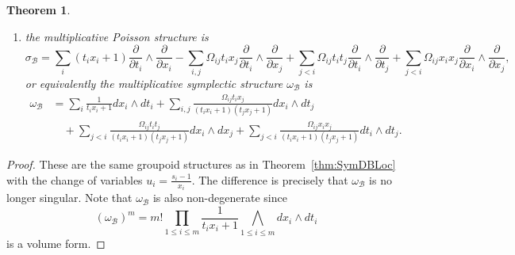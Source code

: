\documentclass{amsart}
\newtheorem{theorem}{Theorem}[section]
\numberwithin{equation}{section}
\newcommand{\cB}{\mathcal{B}}
\begin{document}
\begin{theorem}
\begin{enumerate}
        where $u''_i = \left( u'_i (u_ix_i+1) \prod_{j=1}^m (u_jx_j+1)^{\Omega_{ji}} + u_i \right)$;
    \item the multiplicative Poisson structure is
    \begin{equation}
	\sigma_\cB = \sum_{i} (t_i x_i + 1) \frac{\partial}{\partial t_i} \wedge \frac{\partial}{\partial x_i} - \sum_{i, j} \Omega_{ij}t_i x_j \frac{\partial}{\partial t_i} \wedge \frac{\partial}{\partial x_j} +\sum_{j < i} \Omega_{ij}t_it_j \frac{\partial}{\partial t_i} \wedge \frac{\partial}{\partial t_j} + \sum_{j < i} \Omega_{ij}x_ix_j \frac{\partial}{\partial x_i} \wedge \frac{\partial}{\partial x_j},
    \end{equation}
    or equivalently the multiplicative symplectic structure $\omega_\cB$ is
    \begin{align*} 
	\omega_\cB & = \sum_{i} \frac{1}{t_ix_i+1}dx_i \wedge dt_i + \sum_{i, j} \frac{\Omega_{ij}t_ix_j}{(t_ix_i+1)(t_jx_j+1)}  dx_i \wedge dt_j \\
	& \quad + \sum_{j < i}\frac{\Omega_{ij}t_it_j}{(t_ix_i+1)(t_jx_j+1)}  dx_i \wedge dx_j + \sum_{j < i} \frac{\Omega_{ij}x_ix_j}{(t_ix_i+1)(t_jx_j+1)}  dt_i \wedge dt_j.
      \end{align*}
  \end{enumerate}
\end{theorem}

\begin{proof}
  These are the same groupoid structures as in Theorem~\ref{thm:SymDBLoc} with the change of variables $u_i = \frac{s_i-1}{x_i}$.
  The difference is precisely that $\omega_\cB$ is no longer singular. Note that $\omega_\cB$ is also non-degenerate since
  \[(\omega_\cB)^m = m!  \prod_{1\leq i\leq m} \frac{1}{t_ix_i+1} \bigwedge\limits_{1\leq i\leq m} dx_i \wedge dt_i\]
  is a volume form.
\end{proof}
\end{document}
